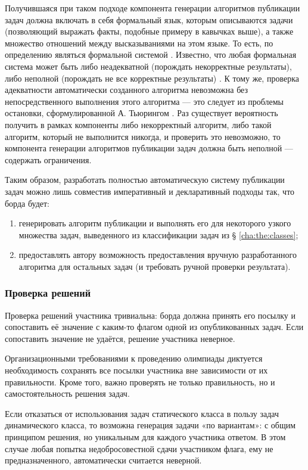 Получившаяся при таком подходе компонента генерации алгоритмов публикации задач должна включать в себя формальный язык, которым описываются задачи (позволяющий выражать факты, подобные примеру в кавычках выше), а также множество отношений между высказываниями на этом языке. То есть, по определению являться формальной системой \cite{Vereshen08-3}. Известно, что любая формальная система может быть либо неадекватной (порождать некорректные результаты), либо неполной (порождать не все корректные результаты) \cite{Vereshen08-3}. К тому же, проверка адекватности автоматически созданного алгоритма невозможна без непосредственного выполнения этого алгоритма — это следует из проблемы остановки, сформулированной А. Тьюрингом \cite{Turing37}. Раз существует вероятность получить в рамках компоненты либо некорректный алгоритм, либо такой алгоритм, который не выполнится никогда, и проверить это невозможно, то компонента генерации алгоритмов публикации задач должна быть неполной — содержать ограничения.

Таким образом, разработать полностью автоматическую систему публикации задач можно лишь совместив императивный и декларативный подходы так, что борда будет:

\begin{enumerate}
\item генерировать алгоритм публикации и выполнять его для некоторого узкого множества задач, выведенного из классификации задач из § \ref{cha:the:classes};
\item предоставлять автору возможность предоставления вручную разработанного алгоритма для остальных задач (и требовать ручной проверки результата).
\end{enumerate}

\subsubsection{Проверка решений}

Проверка решений участника тривиальна: борда должна принять его посылку и сопоставить её значение с каким-то флагом одной из опубликованных задач. Если сопоставить значение не удаётся, решение участника неверное.

Организационными требованиями к проведению олимпиады диктуется необходимость сохранять все посылки участника вне зависимости от их правильности. Кроме того, важно проверять не только правильность, но и самостоятельность решения задач.

Если отказаться от использования задач статического класса в пользу задач динамического класса, то возможна генерация задачи «по вариантам»: с общим принципом решения, но уникальным для каждого участника ответом. В этом случае любая попытка недобросовестной сдачи участником флага, ему не предназначенного, автоматически считается неверной.

